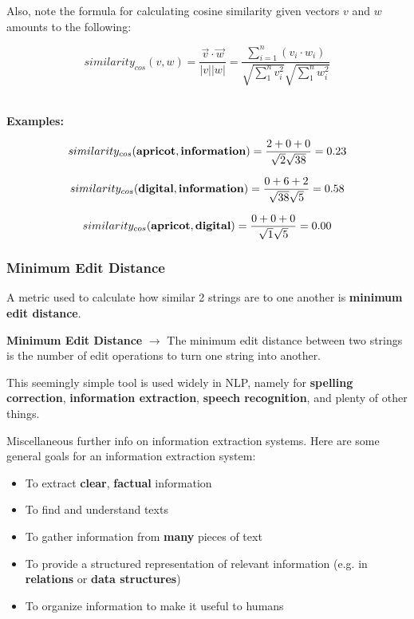 \documentclass[english, 10pt]{article}
\begin{document}
Also, note the formula for calculating cosine similarity given vectors $v$ and $w$ amounts to the following:

$$similarity_{cos}(v,w)=\frac{\vec{v} \cdot \vec{w}}{|v||w|}=\frac{\sum_{i=1}^{n}{(v_i \cdot w_i)}}{\sqrt{\sum_{1}^{n}{v_i^2}} \sqrt{\sum_{1}^{n}{w_i^2}}}$$\\

\begin{myproof}
\textbf{Examples:}

$$similarity_{cos}(\textrm{\textbf{apricot}},\textrm{\textbf{information}})=\frac{2+0+0}{\sqrt{2} \sqrt{38}}=0.23$$

$$similarity_{cos}(\textrm{\textbf{digital}},\textrm{\textbf{information}})=\frac{0+6+2}{\sqrt{38} \sqrt{5}}=0.58$$

$$similarity_{cos}(\textrm{\textbf{apricot}},\textrm{\textbf{digital}})=\frac{0+0+0}{\sqrt{1} \sqrt{5}}=0.00$$
\end{myproof}

\subsubsection{Minimum Edit Distance}

A metric used to calculate how similar 2 strings are to one another is \textbf{minimum edit distance}.\\

\begin{tcolorbox}[title=Definition:,colframe=red!75!black,colback=red!5!white,arc=0pt,fonttitle=\bfseries]
\textbf{Minimum Edit Distance} $\rightarrow$ The minimum edit distance between two strings is the number of edit operations to turn one string into another.
\end{tcolorbox}

\hfill \break This seemingly simple tool is used widely in NLP, namely for \textbf{spelling correction}, \textbf{information extraction}, \textbf{speech recognition}, and plenty of other things.\\

\begin{tcolorbox}[title=Aside: Information Extraction Systems,colframe=black,colback=white,arc=0pt,fonttitle=\bfseries]

Miscellaneous further info on information extraction systems. Here are some general goals for an information extraction system:
\begin{itemize}
	\item To extract \textbf{clear}, \textbf{factual} information
	\item To find and understand texts
	\item To gather information from \textbf{many} pieces of text
	\item To provide a structured representation of relevant information (e.g. in \textbf{relations} or \textbf{data structures})
	\item To organize information to make it useful to humans
\end{itemize}

\end{tcolorbox}
\end{document}
